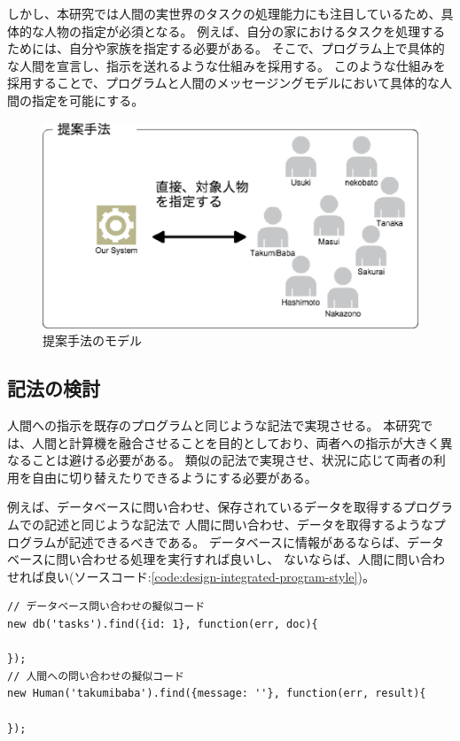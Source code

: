 しかし、本研究では人間の実世界のタスクの処理能力にも注目しているため、具体的な人物の指定が必須となる。
例えば、自分の家におけるタスクを処理するためには、自分や家族を指定する必要がある。
そこで、プログラム上で具体的な人間を宣言し、指示を送れるような仕組みを採用する。
このような仕組みを採用することで、プログラムと人間のメッセージングモデルにおいて具体的な人間の指定を可能にする。

\begin{figure}[htbp]
  \begin{center}
  \includegraphics[width=.5\linewidth]{images/unique_id_model.eps}
  \end{center}
  \caption{提案手法のモデル}
  \label{fig:unique_id_model}
\end{figure}

\subsection{記法の検討}\label{ux8a18ux6cd5ux306eux691cux8a0e}

人間への指示を既存のプログラムと同じような記法で実現させる。
本研究では、人間と計算機を融合させることを目的としており、両者への指示が大きく異なることは避ける必要がある。
類似の記法で実現させ、状況に応じて両者の利用を自由に切り替えたりできるようにする必要がある。

例えば、データベースに問い合わせ、保存されているデータを取得するプログラムでの記述と同じような記法で
人間に問い合わせ、データを取得するようなプログラムが記述できるべきである。
データベースに情報があるならば、データベースに問い合わせる処理を実行すれば良いし、
ないならば、人間に問い合わせれば良い(ソースコード:\ref{code:design-integrated-program-style})。

\begin{lstlisting}[caption=人間への指示を計算機への指示と類似させる, label=code:design-integrated-program-style]
// データベース問い合わせの擬似コード
new db('tasks').find({id: 1}, function(err, doc){

});
// 人間への問い合わせの擬似コード
new Human('takumibaba').find({message: ''}, function(err, result){

});
\end{lstlisting}

